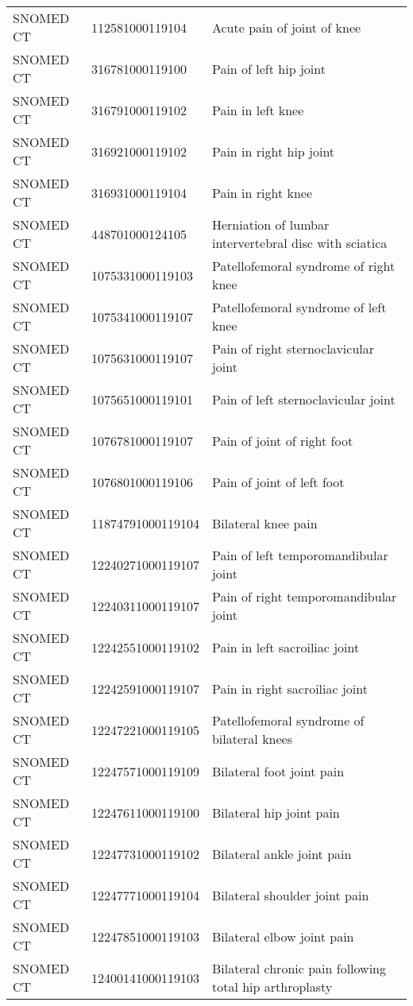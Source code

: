 \begin{longtable}{p{}p{}p{}}
  SNOMED CT & 112581000119104 & Acute pain of joint of knee \\ 
  SNOMED CT & 316781000119100 & Pain of left hip joint \\ 
  SNOMED CT & 316791000119102 & Pain in left knee \\ 
  SNOMED CT & 316921000119102 & Pain in right hip joint \\ 
  SNOMED CT & 316931000119104 & Pain in right knee \\ 
  SNOMED CT & 448701000124105 & Herniation of lumbar intervertebral disc with sciatica \\ 
  SNOMED CT & 1075331000119103 & Patellofemoral syndrome of right knee \\ 
  SNOMED CT & 1075341000119107 & Patellofemoral syndrome of left knee \\ 
  SNOMED CT & 1075631000119107 & Pain of right sternoclavicular joint \\ 
  SNOMED CT & 1075651000119101 & Pain of left sternoclavicular joint \\ 
  SNOMED CT & 1076781000119107 & Pain of joint of right foot \\ 
  SNOMED CT & 1076801000119106 & Pain of joint of left foot \\ 
  SNOMED CT & 11874791000119104 & Bilateral knee pain \\ 
  SNOMED CT & 12240271000119107 & Pain of left temporomandibular joint \\ 
  SNOMED CT & 12240311000119107 & Pain of right temporomandibular joint \\ 
  SNOMED CT & 12242551000119102 & Pain in left sacroiliac joint \\ 
  SNOMED CT & 12242591000119107 & Pain in right sacroiliac joint \\ 
  SNOMED CT & 12247221000119105 & Patellofemoral syndrome of bilateral knees \\ 
  SNOMED CT & 12247571000119109 & Bilateral foot joint pain \\ 
  SNOMED CT & 12247611000119100 & Bilateral hip joint pain \\ 
  SNOMED CT & 12247731000119102 & Bilateral ankle joint pain \\ 
  SNOMED CT & 12247771000119104 & Bilateral shoulder joint pain \\ 
  SNOMED CT & 12247851000119103 & Bilateral elbow joint pain \\ 
  SNOMED CT & 12400141000119103 & Bilateral chronic pain following total hip arthroplasty \\ 

\end{longtable}
